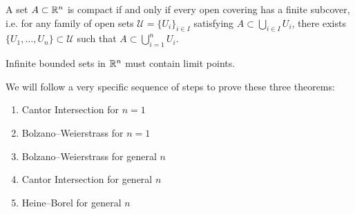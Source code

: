 \begin{theorem}
A set $A\subset\mathbb R^n$ is compact if and only if every open covering has a finite subcover, i.e. for any family of open sets $\mathscr{U}=\{U_i\}_{i\in I}$ satisfying $A\subset\bigcup_{i\in I}U_i$, there exists $\{U_1,\dots,U_n\}\subset\mathscr{U}$ such that $A\subset\bigcup_{i=1}^n U_i$.
\end{theorem}

\begin{theorem}
Infinite bounded sets in $\mathbb R^n$ must contain limit points.
\end{theorem}

We will follow a very specific sequence of steps to prove these three theorems:
\begin{enumerate}[label=(\alph*)]
\item Cantor Intersection for $n=1$
\item Bolzano--Weierstrass for $n=1$
\item Bolzano--Weierstrass for general $n$
\item Cantor Intersection for general $n$
\item Heine--Borel for general $n$
\end{enumerate}

